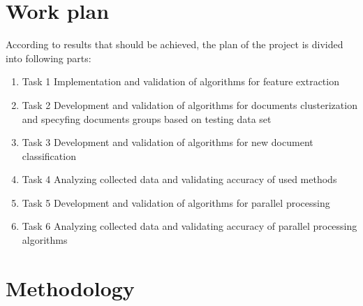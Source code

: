 \section{Work plan}

According to results that should be achieved, the plan of the project is divided into following parts:

\begin{enumerate}

\item Task 1 Implementation and validation of algorithms for feature extraction

\item  Task 2 Development and validation of algorithms for documents clusterization and specyfing documents groups based on testing data set

\item  Task 3 Development and validation of algorithms for
 new document classification

\item  Task 4 Analyzing collected data and validating accuracy of used methods

\item Task 5 Development and validation of algorithms for parallel processing 

\item  Task 6 Analyzing collected data and validating accuracy of parallel processing algorithms



\end{enumerate}

\section{Methodology}